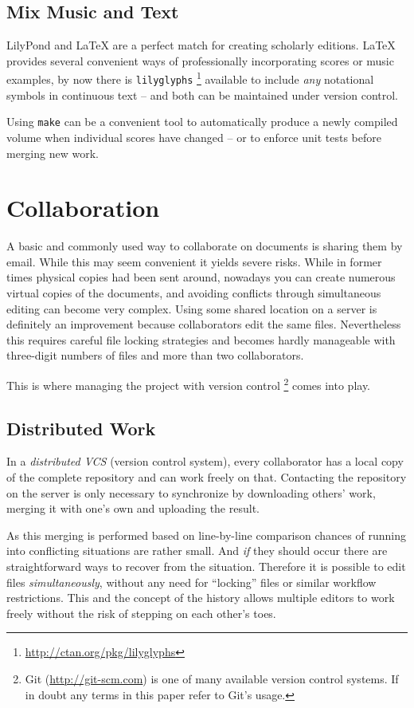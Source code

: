 \documentclass[11pt,a4paper]{article}
\begin{document}
\subsection{Mix Music and Text}
LilyPond and \LaTeX{} are a perfect match for creating scholarly editions. \LaTeX{}
provides several convenient ways of professionally incorporating scores or music examples,
by now there is \texttt{lilyglyphs}%
\footnote{\url{http://ctan.org/pkg/lilyglyphs}}
available to include \emph{any} notational symbols in continuous text -- and both
can be maintained under version control.

Using \texttt{make} can be a convenient tool to automatically produce a newly compiled
volume when individual scores have changed -- or to enforce unit tests before merging
new work.

\section{Collaboration}\label{sec:collaboration}
A basic and commonly used way to collaborate on documents is sharing them by email.
While this may seem convenient it yields severe risks. While in former times physical
copies had been sent around, nowadays you can create numerous virtual copies of
the documents, and avoiding conflicts through simultaneous editing can
become very complex. Using some shared location on a server is definitely an improvement
because collaborators edit the same files. Nevertheless this requires careful file locking
strategies and becomes hardly manageable with three-digit numbers of files and more than
two collaborators.

This is where managing the project with version control%
\footnote{Git (\url{http://git-scm.com}) is one of many available version control systems.
If in doubt any terms in this paper refer to Git's usage.}
comes into play.

\subsection{Distributed Work}
In a \textsl{distributed VCS} (version control system), every collaborator
has a local copy of the complete repository and can work freely on that.
Contacting the repository on the server is only necessary to synchronize by downloading
others' work, merging it with one's own and uploading the result.

As this merging is performed based on line-by-line comparison chances of running into
conflicting situations are rather small. And \emph{if} they should occur there are
straightforward ways to recover from the situation. Therefore it is possible to edit files
\emph{simultaneously}, without any need for “locking” files or similar workflow
restrictions. This and the concept of the history allows multiple editors to work freely without the risk of stepping on each other's toes. 
\end{document}
